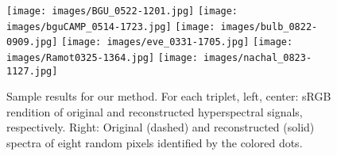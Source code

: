 \documentclass[10pt,twocolumn,letterpaper]{article}
\begin{document}
\begin{figure*}[h]%
	\begin{center}
        \texttt{[image: images/BGU\_0522-1201.jpg]}
		\texttt{[image: images/bguCAMP\_0514-1723.jpg]}
		\texttt{[image: images/bulb\_0822-0909.jpg]}
		\texttt{[image: images/eve\_0331-1705.jpg]}
		\texttt{[image: images/Ramot0325-1364.jpg]}
		\texttt{[image: images/nachal\_0823-1127.jpg]}
	\end{center}
	\caption{Sample results for our method. For each triplet, left, center: sRGB rendition of original and reconstructed hyperspectral signals, respectively. Right: Original (dashed) and reconstructed (solid) spectra of eight random pixels identified by the colored dots.}
	\label{fig:results}
\end{figure*}
\end{document}
